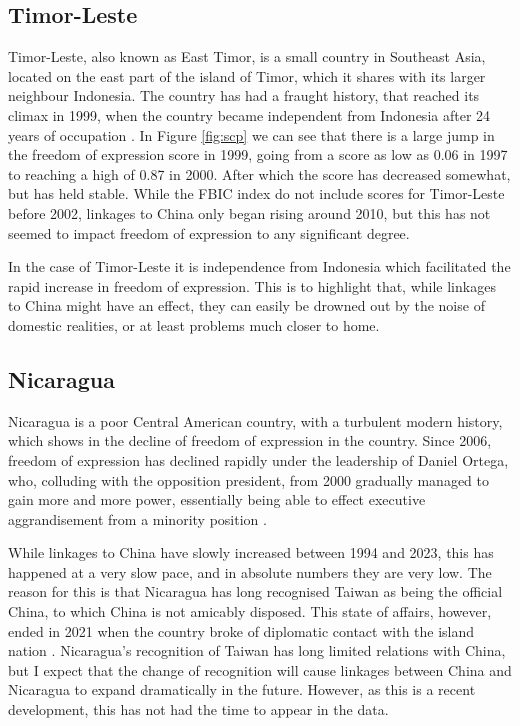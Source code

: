 \subsection{Timor-Leste}
Timor-Leste, also known as East Timor, is a small country in Southeast Asia, located on the east part of the island of Timor, which it shares with its larger neighbour Indonesia. The country has had a fraught history, that reached its climax in 1999, when the country became independent from Indonesia after 24 years of occupation \citep[p. 183]{kingsbury_democratic_2014}. In Figure \ref{fig:scp} we can see that there is a large jump in the freedom of expression score in 1999, going from a score as low as 0.06 in 1997 to reaching a high of 0.87 in 2000. After which the score has decreased somewhat, but has held stable. While the FBIC index do not include scores for Timor-Leste before 2002, linkages to China only began rising around 2010, but this has not seemed to impact freedom of expression to any significant degree.

In the case of Timor-Leste it is independence from Indonesia which facilitated the rapid increase in freedom of expression. This is to highlight that, while linkages to China might have an effect, they can easily be drowned out by the noise of domestic realities, or at least problems much closer to home.

\subsection{Nicaragua}
Nicaragua is a poor Central American country, with a turbulent modern history, which shows in the decline of freedom of expression in the country. Since 2006, freedom of expression has declined rapidly under the leadership of Daniel Ortega, who, colluding with the opposition president, from 2000 gradually managed to gain more and more power, essentially being able to effect executive aggrandisement from a minority position \citep{mcconnell_elite_2024}.

While linkages to China have slowly increased between 1994 and 2023, this has happened at a very slow pace, and in absolute numbers they are very low. The reason for this is that Nicaragua has long recognised Taiwan as being the official China, to which China is not amicably disposed. This state of affairs, however, ended in 2021 when the country broke of diplomatic contact with the island nation \citep{bbc_nicaragua_2021}. Nicaragua's recognition of Taiwan has long limited relations with China, but I expect that the change of recognition will cause linkages between China and Nicaragua to expand dramatically in the future. However, as this is a recent development, this has not had the time to appear in the data. 

